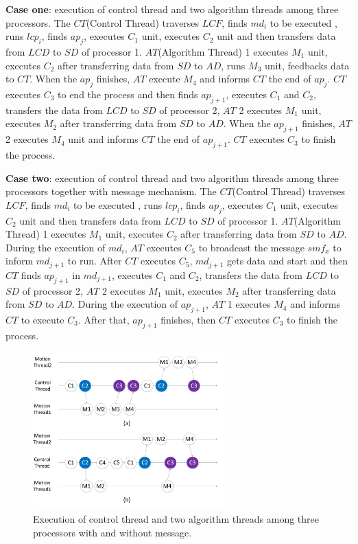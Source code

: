 \documentclass[journal,UTF8]{IEEEtran}
\begin{document}
  \textbf{Case one}: execution of control thread and two algorithm threads among three processors. The $CT$(Control Thread) traverses $LCF$, finds $md_i$ to be executed , runs $lcp_i$, finds $ap_j$, executes $C_1$ unit, executes $C_2$ unit and then transfers data from $LCD$ to $SD$ of processor 1. $AT$(Algorithm Thread) 1 executes $M_1$ unit, executes $C_2$ after transferring data from $SD$ to $AD$, runs $M_3$ unit, feedbacks data to $CT$. When the $ap_j$ finishes, $AT$ execute $M_4$ and informs $CT$ the end of $ap_j$. $CT$ executes $C_3$ to end the process and then finds $ap_{j+1}$, executes $C_1$ and $C_2$, transfers the data from $LCD$ to $SD$ of processor 2, $AT$ 2 executes $M_1$ unit, executes $M_2$ after transferring data from $SD$ to $AD$. When the $ap_{j+1}$ finishes, $AT$ 2 executes $M_4$ unit and informs $CT$ the end of $ap_{j+1}$. $CT$ executes $C_3$ to finish the process.
  
  \textbf{Case two}: execution of control thread and two algorithm threads among three processors together with message mechanism. The $CT$(Control Thread) traverses $LCF$, finds $md_i$ to be executed , runs $lcp_i$, finds $ap_j$, executes $C_1$ unit, executes $C_2$ unit and then transfers data from $LCD$ to $SD$ of processor 1. $AT$(Algorithm Thread) 1 executes $M_1$ unit, executes $C_2$ after transferring data from $SD$ to $AD$. During the execution of $md_i$, $AT$ executes $C_5$ to broadcast the message $smf_x$ to inform $md_{j+1}$ to run. After $CT$ executes $C_5$, $md_{j+1}$ gets data and start and then $CT$ finds $ap_{j+1}$ in $md_{j+1}$, executes $C_1$ and $C_2$, transfers the data from $LCD$ to $SD$ of processor 2, $AT$ 2 executes $M_1$ unit, executes $M_2$ after transferring data from $SD$ to $AD$. During the execution of $ap_{j+1}$, $AT$ 1 executes $M_4$ and informs $CT$ to execute $C_3$. After that, $ap_{j+1}$ finishes, then $CT$ executes $C_3$ to finish the process.
  

  
  \begin{figure}
  	\centering
  	\includegraphics[width=3in]{fig/threadFlow.pdf}
  	\caption{ Execution of control thread and two algorithm threads among three processors with and without message.}
  	\label{fig:threadFlow}
  \end{figure}
\end{document}
